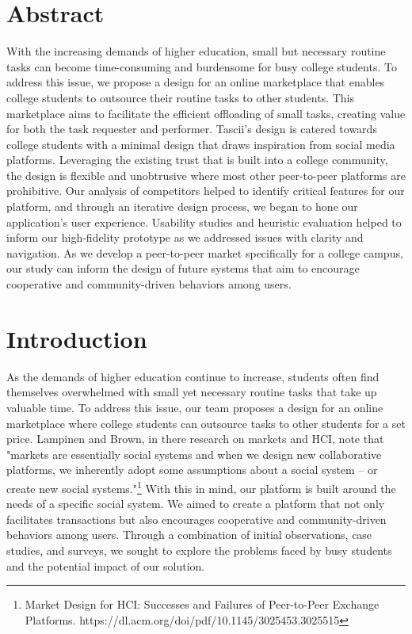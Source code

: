 
\section{Abstract}
With the increasing demands of higher education, small but necessary routine tasks can become time-consuming and burdensome for busy college students. To address this issue, we propose a design for an online marketplace that enables college students to outsource their routine tasks to other students. This marketplace aims to facilitate the efficient offloading of small tasks, creating value for both the task requester and performer. Tascii's design is catered towards college students with a minimal design that draws inspiration from social media platforms. Leveraging the existing trust that is built into a college community, the design is flexible and unobtrusive where most other peer-to-peer platforms are prohibitive. Our analysis of competitors helped to identify critical features for our platform, and through an iterative design process, we began to hone our application's user experience. Usability studies and heuristic evaluation helped to inform our high-fidelity prototype as we addressed issues with clarity and navigation. As we develop a peer-to-peer market specifically for a college campus, our study can inform the design of future systems that aim to encourage cooperative and community-driven behaviors among users.

\section{Introduction}

As the demands of higher education continue to increase, students often find themselves overwhelmed with small yet necessary routine tasks that take up valuable time. To address this issue, our team proposes a design for an online marketplace where college students can outsource tasks to other students for a set price. Lampinen and Brown, in there research on markets and HCI, note that "markets are essentially social systems and when we design new collaborative platforms, we inherently adopt some assumptions about a social system – or create new social systems."\footnote{Market Design for HCI: Successes and Failures of Peer-to-Peer Exchange Platforms. https://dl.acm.org/doi/pdf/10.1145/3025453.3025515} With this in mind, our platform is built  around the needs of a specific social system. We aimed to create a platform that not only facilitates transactions but also encourages cooperative and community-driven behaviors among users. Through a combination of initial observations, case studies, and surveys, we sought to explore the problems faced by busy students and the potential impact of our solution.

